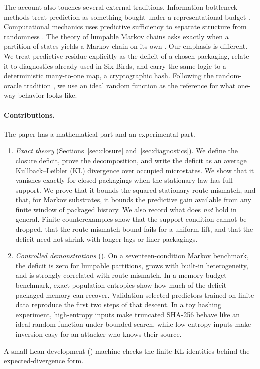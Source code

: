 The account also touches several external traditions. Information-bottleneck methods treat prediction as something bought under a representational budget \citep{tishby1999bottleneck,geiger2015optimalkullbackleibleraggregation}. Computational mechanics uses predictive sufficiency to separate structure from randomness \citep{shalizi2001computationalmechanics}. The theory of lumpable Markov chains asks exactly when a partition of states yields a Markov chain on its own \citep{kemeny1976finitemarkovchains,buchholz1994exactordinarylumpability}. Our emphasis is different. We treat predictive residue explicitly as the deficit of a chosen packaging, relate it to diagnostics already used in Six Birds, and carry the same logic to a deterministic many-to-one map, a cryptographic hash. Following the random-oracle tradition \citep{bellare1993randomoracles}, we use an ideal random function as the reference for what one-way behavior looks like.

\paragraph{Contributions.} The paper has a mathematical part and an experimental part.
\begin{enumerate}
\item \emph{Exact theory} (Sections~\ref{sec:closure} and~\ref{sec:diagnostics}). We define the closure deficit, prove the decomposition, and write the deficit as an average Kullback--Leibler (KL) divergence over occupied microstates. We show that it vanishes exactly for closed packagings when the stationary law has full support. We prove that it bounds the squared stationary route mismatch, and that, for Markov substrates, it bounds the predictive gain available from any finite window of packaged history. We also record what does \emph{not} hold in general. Finite counterexamples show that the support condition cannot be dropped, that the route-mismatch bound fails for a uniform lift, and that the deficit need not shrink with longer lags or finer packagings.
\item \emph{Controlled demonstrations} (). On a seventeen-condition Markov benchmark, the deficit is zero for lumpable partitions, grows with built-in heterogeneity, and is strongly correlated with route mismatch. In a memory-budget benchmark, exact population entropies show how much of the deficit packaged memory can recover. Validation-selected predictors trained on finite data reproduce the first two steps of that descent. In a toy hashing experiment, high-entropy inputs make truncated SHA-256 behave like an ideal random function under bounded search, while low-entropy inputs make inversion easy for an attacker who knows their source.
\end{enumerate}
A small Lean development () machine-checks the finite KL identities behind the expected-divergence form.

